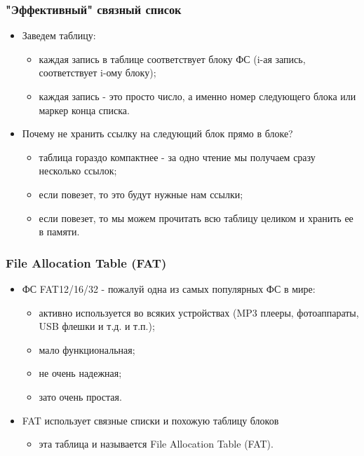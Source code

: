\begin{frame}
\frametitle{"Эффективный" связный список}
\begin{itemize}
  \item Заведем таблицу:
  \begin{itemize}
    \item каждая запись в таблице соответствует блоку ФС (i-ая запись,
    соответствует i-ому блоку);
    \item каждая запись - это просто число, а именно номер следующего блока или
    маркер конца списка.
  \end{itemize}
  \item Почему не хранить ссылку на следующий блок прямо в блоке?
  \begin{itemize}
    \item таблица гораздо компактнее - за одно чтение мы получаем сразу
    несколько ссылок;
    \item если повезет, то это будут нужные нам ссылки;
    \item если повезет, то мы можем прочитать всю таблицу целиком и хранить ее
    в памяти.
  \end{itemize}
\end{itemize}
\end{frame}

\begin{frame}
\frametitle{File Allocation Table (FAT)}
\begin{itemize}
  \item ФС FAT12/16/32 - пожалуй одна из самых популярных ФС в мире:
  \begin{itemize}
    \item активно используется во всяких устройствах (MP3 плееры, фотоаппараты,
    USB флешки и т.д. и т.п.);
    \item мало функциональная;
    \item не очень надежная;
    \item зато очень простая.
  \end{itemize}
  \item FAT использует связные списки и похожую таблицу блоков
  \begin{itemize}
    \item эта таблица и называется File Allocation Table (FAT).
  \end{itemize}
\end{itemize}
\end{frame}
